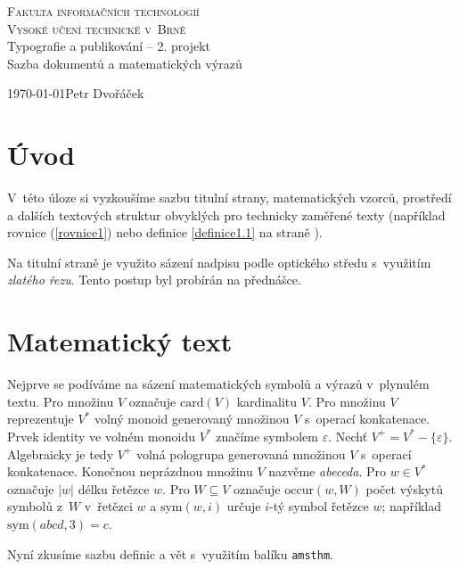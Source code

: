 \documentclass[11pt,a4paper,twocolumn]{article}
\begin{document}
\begin{titlepage}
\begin{center}
{\Large \textsc{Fakulta informačních technologií \\ Vysoké učení technické v~Brně}}\\
{\LARGE Typografie a publikování -- 2. projekt}\\
\medskip
{\Huge Sazba dokumentů a matematických výrazů}
{}
\end{center}

{\Large { \today \hfill Petr Dvořáček}}\\
\end{titlepage}

\section*{Úvod} 
V~této úloze si vyzkoušíme sazbu titulní strany, matematických vzorců, prostředí a dalších textových struktur obvyklých pro technicky zaměřené texty (například rovnice (\ref{rovnice1}) nebo definice \ref{definice1.1} na straně \pageref{definice1.1}).

Na titulní straně je využito sázení nadpisu podle optického středu s~využitím \emph{zlatého řezu}. Tento postup byl probírán na přednášce.


\section{Matematický text}
Nejprve se podíváme na sázení matematických symbolů a výrazů v~plynulém textu. Pro množinu $V$ označuje $\mbox{card}(V)$ kardinalitu $V$. Pro množinu $V$ reprezentuje $V^*$ volný monoid generovaný množinou $V$ s~operací konkatenace. Prvek identity ve volném monoidu $V^*$ značíme symbolem $\varepsilon$.
Nechť $V^+ = V^* - \{\varepsilon\}$. Algebraicky je tedy $V^+$ volná pologrupa generovaná množinou $V$ s~operací konkatenace. Konečnou neprázdnou množinu $V$ nazvěme \emph{abeceda}. Pro $w \in V^*$ označuje $|w|$ délku řetězce $w$. Pro $W \subseteq V$ označuje $\mbox{occur}(w,W)$ počet výskytů symbolů z~$W$ v~řetězci $w$ a $\mbox{sym}(w,i)$ určuje $i$-tý symbol řetězce $w$; například $\mbox{sym}(abcd,3)=c$.


Nyní zkusíme sazbu definic a vět s~využitím balíku \texttt{amsthm}.
\end{document}
